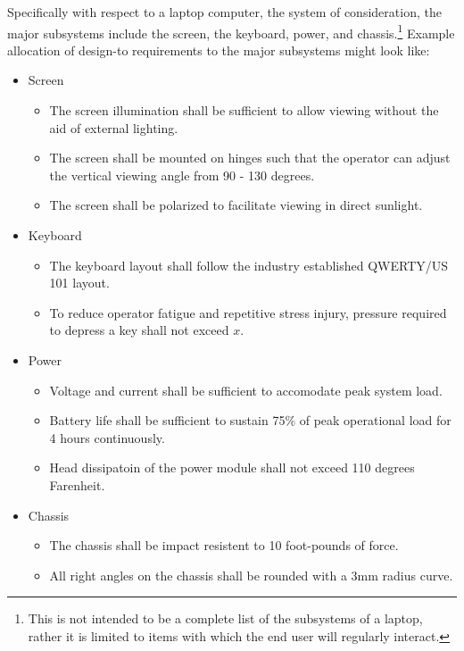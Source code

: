 \documentclass[letterpaper,10pt]{article}
\begin{document}
\begin{description}
\begin{itemize}
\end{itemize}
\par Specifically with respect to a laptop computer, the system of consideration, the major subsystems include the screen, the keyboard, power, and chassis.\footnote{This is not intended to be a complete list of the subsystems of a laptop, rather it is limited to items with which the end user will regularly interact.}  Example allocation of design-to requirements to the major subsystems might look like:
\begin{itemize}
\item Screen
	\begin{itemize}
	\item The screen illumination shall be sufficient to allow viewing without the aid of external lighting.
	\item The screen shall be mounted on hinges such that the operator can adjust the vertical viewing angle from 90 - 130 degrees.
	\item The screen shall be polarized to facilitate viewing in direct sunlight.
	\end{itemize}
\item Keyboard
	\begin{itemize}
	\item The keyboard layout shall follow the industry established QWERTY/US 101 layout.
	\item To reduce operator fatigue and repetitive stress injury, pressure required to depress a key shall not exceed $x$.
	\end{itemize}
\item Power
	\begin{itemize}
	\item Voltage and current shall be sufficient to accomodate peak system load.
	\item Battery life shall be sufficient to sustain 75\% of peak operational load for 4 hours continuously.
	\item Head dissipatoin of the power module shall not exceed 110 degrees Farenheit.
	\end{itemize}
\item Chassis
	\begin{itemize}
	\item The chassis shall be impact resistent to 10 foot-pounds of force.
	\item All right angles on the chassis shall be rounded with a 3mm radius curve.
	\end{itemize}
\end{itemize}

\end{description}
\end{document}
